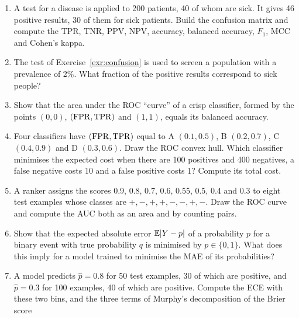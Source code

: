 \begin{enumerate}[label=\textbf{1.\arabic*},ref=1.\arabic*,leftmargin=*,itemsep=6pt]
  \item\label{exr:confusion} A test for a disease is applied to 200 patients, 40 of whom are
        sick. It gives 46 positive results, 30 of them for sick patients. Build the confusion
        matrix and compute the TPR, TNR, PPV, NPV, accuracy, balanced accuracy, $F_1$, MCC and
        Cohen's kappa.
  \item\label{exr:ppv} The test of Exercise~\ref{exr:confusion} is used to screen a population
        with a prevalence of 2\%. What fraction of the positive results correspond to sick
        people?
  \item\label{exr:aucba} Show that the area under the ROC ``curve'' of a crisp classifier,
        formed by the points $(0,0)$, $(\mathrm{FPR},\mathrm{TPR})$ and $(1,1)$, equals its balanced accuracy.
  \item\label{exr:hull} Four classifiers have $(\mathrm{FPR},\mathrm{TPR})$ equal to A $(0.1,0.5)$,
        B $(0.2,0.7)$, C $(0.4,0.9)$ and D $(0.3,0.6)$. Draw the ROC convex hull. Which
        classifier minimises the expected cost when there are 100 positives and 400 negatives,
        a false negative costs 10 and a false positive costs 1? Compute its total cost.
  \item\label{exr:roc} A ranker assigns the scores 0.9, 0.8, 0.7, 0.6, 0.55, 0.5, 0.4 and 0.3
        to eight test examples whose classes are $+,-,+,+,-,-,+,-$. Draw the ROC curve and
        compute the AUC both as an area and by counting pairs.
  \item\label{exr:proper} Show that the expected absolute error $\mathbb{E}|Y-p|$ of a probability $p$
        for a binary event with true probability $q$ is minimised by $p\in\{0,1\}$. What does
        this imply for a model trained to minimise the MAE of its probabilities?
  \item\label{exr:calib} A model predicts $\hat p=0.8$ for 50 test examples, 30 of which are
        positive, and $\hat p=0.3$ for 100 examples, 40 of which are positive. Compute the ECE
        with these two bins, and the three terms of Murphy's decomposition of the Brier score

\end{enumerate}
